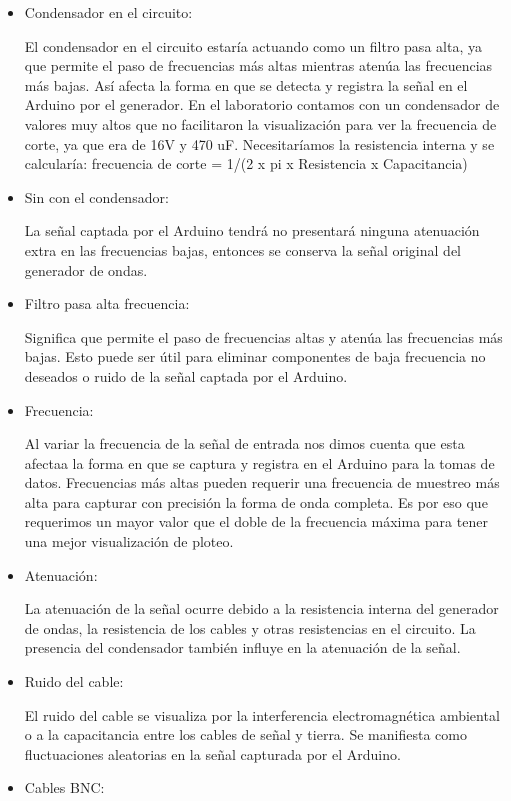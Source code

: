 \documentclass[
  letterpaper,
  DIV=11,
  numbers=noendperiod]{scrartcl}
\begin{document}
\begin{itemize}
\item
  Condensador en el circuito:

  El condensador en el circuito estaría actuando como un filtro pasa
  alta, ya que permite el paso de frecuencias más altas mientras atenúa
  las frecuencias más bajas. Así afecta la forma en que se detecta y
  registra la señal en el Arduino por el generador. En el laboratorio
  contamos con un condensador de valores muy altos que no facilitaron la
  visualización para ver la frecuencia de corte, ya que era de 16V y 470
  uF. Necesitaríamos la resistencia interna y se calcularía: frecuencia
  de corte = 1/(2 x pi x Resistencia x Capacitancia)
\item
  Sin con el condensador:

  La señal captada por el Arduino tendrá no presentará ninguna
  atenuación extra en las frecuencias bajas, entonces se conserva la
  señal original del generador de ondas.
\item
  Filtro pasa alta frecuencia:

  Significa que permite el paso de frecuencias altas y atenúa las
  frecuencias más bajas. Esto puede ser útil para eliminar componentes
  de baja frecuencia no deseados o ruido de la señal captada por el
  Arduino.
\item
  Frecuencia:

  Al variar la frecuencia de la señal de entrada nos dimos cuenta que
  esta afectaa la forma en que se captura y registra en el Arduino para
  la tomas de datos. Frecuencias más altas pueden requerir una
  frecuencia de muestreo más alta para capturar con precisión la forma
  de onda completa. Es por eso que requerimos un mayor valor que el
  doble de la frecuencia máxima para tener una mejor visualización de
  ploteo.
\item
  Atenuación:

  La atenuación de la señal ocurre debido a la resistencia interna del
  generador de ondas, la resistencia de los cables y otras resistencias
  en el circuito. La presencia del condensador también influye en la
  atenuación de la señal.
\item
  Ruido del cable:

  El ruido del cable se visualiza por la interferencia electromagnética
  ambiental o a la capacitancia entre los cables de señal y tierra. Se
  manifiesta como fluctuaciones aleatorias en la señal capturada por el
  Arduino.
\item
  Cables BNC:


\end{itemize}
\end{document}
